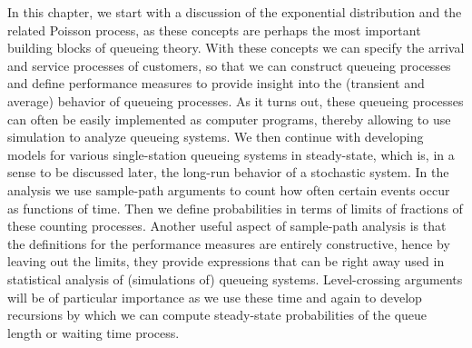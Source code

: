 In this chapter, we start with a discussion of the exponential
distribution and the related Poisson process, as these concepts are
perhaps the most important building blocks of queueing theory. With
these concepts we can specify the arrival and service processes of
customers, so that we can construct queueing processes and define
performance measures to provide insight into the (transient and
average) behavior of queueing processes. As it turns out, these
queueing processes can often be easily implemented as computer programs, thereby
allowing to use simulation to analyze queueing systems. We then
continue with developing models for various single-station queueing
systems in steady-state, which is, in a sense to be discussed later,
the long-run behavior of a stochastic system. In the analysis we use
sample-path arguments to count how often certain events occur as
functions of time. Then we define probabilities in terms of limits of
fractions of these counting processes. Another useful aspect of
sample-path analysis is that the definitions for the performance
measures are entirely constructive, hence by leaving out the limits,
they provide expressions that can be right away used in statistical
analysis of (simulations of) queueing systems. Level-crossing
arguments will be of particular importance as we use these time and
again to develop recursions by which we can compute steady-state
probabilities of the queue length or waiting time process.


